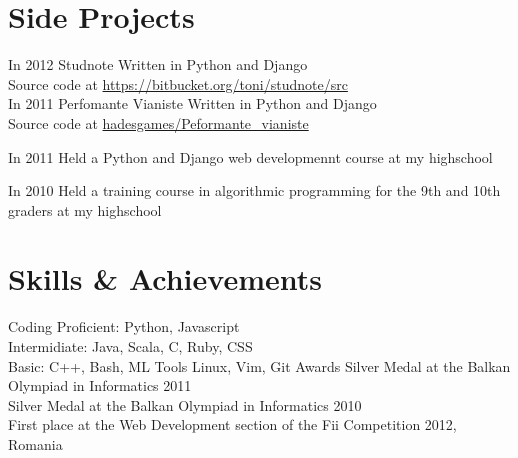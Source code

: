\documentclass[]{friggeri-cv}
\begin{document}
\section{Side Projects}

\begin{entrylist}
  \entry
  {In 2012} 
  {}
  {Studnote}
  {}
  {
    Written in Python and Django \\ 
    Source code at \href{http://bitbucket.org/toni/studnote/src}{https://bitbucket.org/toni/studnote/src} \\
  }
  \entry
  {In 2011}
  {}
  {Perfomante Vianiste}
  {}
  {
    Written in Python and Django \\
    Source code at \href{https://github.com/hadesgames/Performante\_vianiste}{hadesgames/Peformante\_vianiste}
  }

  \entry
  {In 2011}
  {}
  {Held a Python and Django web developmennt course at my highschool}
  {}
  {}

  \entry
  {In 2010}
  {}
  {Held a training course in algorithmic programming for the 9th and 10th graders at my highschool}
  {}
  {}
\end{entrylist}

\section{Skills \& Achievements}
\entry
{Coding}{}
{
  Proficient:  Python, Javascript \\
  Intermidiate:  Java, Scala, C, Ruby, CSS \\
  Basic:  C++, Bash, ML
}{}{}
\entry
{Tools}{}
{
  Linux, Vim, Git
}{}{}
\entry
{Awards}{}
{
  Silver Medal at the Balkan Olympiad in Informatics 2011 \\
Silver Medal at the Balkan Olympiad in Informatics 2010 \\
First place at the Web Development section of the Fii Competition 2012, Romania
}
{}{}
\end{document}
